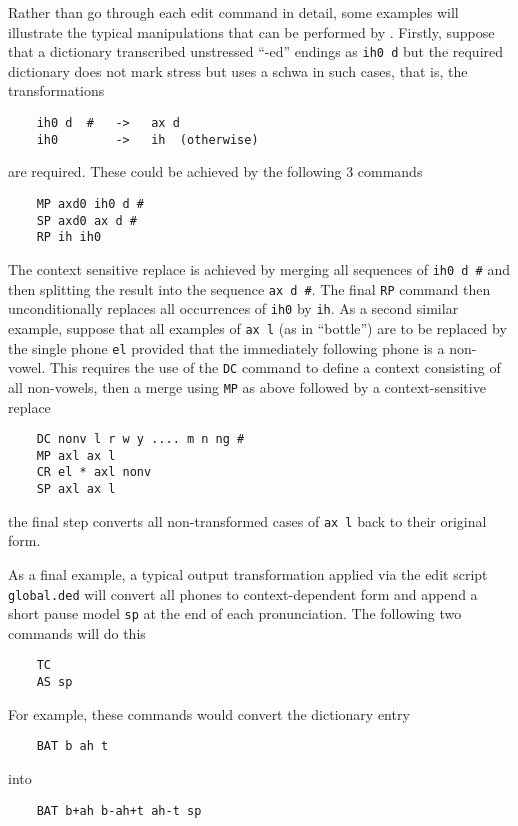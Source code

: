 Rather than go through each  edit command in detail, some examples
will illustrate the typical manipulations that can be performed
by .  Firstly, suppose that a dictionary transcribed
unstressed ``-ed'' endings as \texttt{ih0 d}
but the required dictionary
does not mark stress but uses a schwa in such cases, that is,
the transformations
\begin{verbatim}
    ih0 d  #   ->   ax d
    ih0        ->   ih  (otherwise)
\end{verbatim}
are required.
These could be achieved by the following 3 commands
\begin{verbatim}
    MP axd0 ih0 d #
    SP axd0 ax d #
    RP ih ih0
\end{verbatim}
The context sensitive replace is achieved by merging all sequences
of \texttt{ih0 d \#} and then splitting the result into the sequence
\texttt{ax d \#}.  The final \texttt{RP} command then unconditionally
replaces all occurrences of \texttt{ih0} by \texttt{ih}.
As a second similar example, suppose that all examples of \texttt{ax l}
(as in ``bottle'') are to be replaced by the single phone \texttt{el}
provided that the immediately following phone is a non-vowel.
This requires the use of the \texttt{DC} command to define a
context consisting of all non-vowels, then a merge using  \texttt{MP}
as above followed by a context-sensitive replace
\begin{verbatim}
    DC nonv l r w y .... m n ng #
    MP axl ax l
    CR el * axl nonv
    SP axl ax l
\end{verbatim}
the final step converts all non-transformed cases of \texttt{ax l}
back to their original form.

As a final example, a typical output transformation applied via
the edit script \texttt{global.ded} will convert all phones to
context-dependent form and append a short pause model \texttt{sp}
at the end of each pronunciation.  The following two commands will
do this
\begin{verbatim}
    TC
    AS sp
\end{verbatim}
For example, these commands would convert the dictionary entry
\begin{verbatim}
    BAT b ah t
\end{verbatim}
into
\begin{verbatim}
    BAT b+ah b-ah+t ah-t sp
\end{verbatim}

